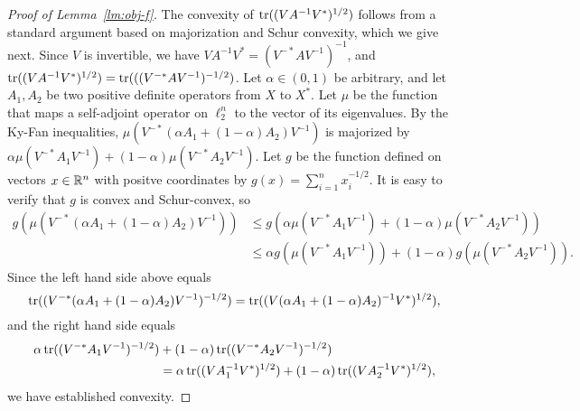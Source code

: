 \begin{proof}[Proof of Lemma~\ref{lm:obj-f}]
  The convexity of $\operatorname{tr}((VA^{-1}V^*)^{1/2})$ follows from a standard
  argument based on majorization and Schur convexity, which we give
  next.  Since $V$ is invertible, we have $VA^{-1}V^* =
  (V^{-*}AV^{-1})^{-1}$, and $\operatorname{tr}((VA^{-1}V^*)^{1/2}) =
  \operatorname{tr}(((V^{-*}AV^{-1})^{-1/2})$. Let $\alpha \in (0,1)$ be arbitrary,
  and let $A_1, A_2$ be two positive definite operators from $X$ to
  $X^*$. Let $\mu$ be the function that maps a self-adjoint operator
  on $\ell_2^n$ to the vector of its eigenvalues. By the Ky-Fan
  inequalities, $\mu(V^{-*}(\alpha A_1 + (1-\alpha)A_2)V^{-1})$ is
  majorized by $\alpha \mu(V^{-*}A_1V^{-1}) + (1-\alpha)
  \mu(V^{-*}A_2V^{-1})$. Let $g$ be the function defined on vectors $x
  \in {\mathbb{R}}^n$ with positve coordinates by $g(x) =
  \sum_{i=1}^n{x_i^{-1/2}}$. It is easy to verify that $g$ is convex
  and Schur-convex, so
  \begin{align*}
  g(\mu(V^{-*}(\alpha A_1 + (1-\alpha)A_2)V^{-1}))
  &\le
  g(\alpha \mu(V^{-*}A_1V^{-1}) + (1-\alpha) \mu(V^{-*}A_2V^{-1}))\\
  &\le 
  \alpha g(\mu(V^{-*}A_1V^{-1})) + (1-\alpha) g(\mu(V^{-*}A_2V^{-1})).
  \end{align*}
  Since the left hand side above equals   
  \[
  \operatorname{tr}((V^{-*}(\alpha A_1 + (1-\alpha)A_2)V^{-1})^{-1/2})
  = 
  \operatorname{tr}((V(\alpha A_1 + (1-\alpha)A_2)^{-1}V^*)^{1/2}),
  \]
  and the right hand side equals
  \begin{align*}
  \alpha \operatorname{tr}((V^{-*}A_1V^{-1})^{-1/2}) &+  (1- \alpha) \operatorname{tr}((V^{-*}A_2V^{-1})^{-1/2})\\
  &= 
  \alpha \operatorname{tr}((VA_1^{-1}V^*)^{1/2}) +  (1- \alpha) \operatorname{tr}((VA_2^{-1}V^*)^{1/2}),
  \end{align*}
  we have established convexity.   
 


\end{proof}
